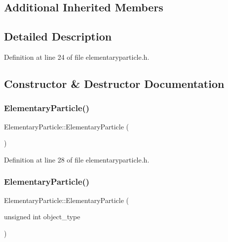 \subsection*{Additional Inherited Members}


\subsection{Detailed Description}


Definition at line 24 of file elementaryparticle.\+h.



\subsection{Constructor \& Destructor Documentation}
\mbox{\label{class_elementary_particle_a4035ffd6ce053ea3390632fa530c6e21}} 
\subsubsection{\texorpdfstring{Elementary\+Particle()}{ElementaryParticle()}\hspace{0.1cm}{\footnotesize\ttfamily [1/4]}}
{\footnotesize\ttfamily Elementary\+Particle\+::\+Elementary\+Particle (\begin{DoxyParamCaption}{ }\end{DoxyParamCaption})\hspace{0.3cm}{\ttfamily [inline]}}



Definition at line 28 of file elementaryparticle.\+h.

\mbox{\label{class_elementary_particle_a6bd3ad699e15769c1860e3068020a824}} 
\subsubsection{\texorpdfstring{Elementary\+Particle()}{ElementaryParticle()}\hspace{0.1cm}{\footnotesize\ttfamily [2/4]}}
{\footnotesize\ttfamily Elementary\+Particle\+::\+Elementary\+Particle (\begin{DoxyParamCaption}\item[{unsigned int}]{object\+\_\+type }\end{DoxyParamCaption})\hspace{0.3cm}{\ttfamily [inline]}}



